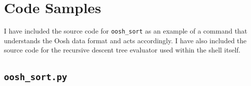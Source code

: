 \documentclass[12pt,twoside,notitlepage]{report}
\begin{document}
\parindent 0pt
\parskip 6pt


\chapter{Code Samples}

I have included the source code for {\tt oosh\_sort} as an example of
a command that understands the Oosh data format and acts
accordingly. I have also included the source code for the recursive
descent tree evaluator used within the shell itself.

\section{{\tt oosh\_sort.py}}
\end{document}
